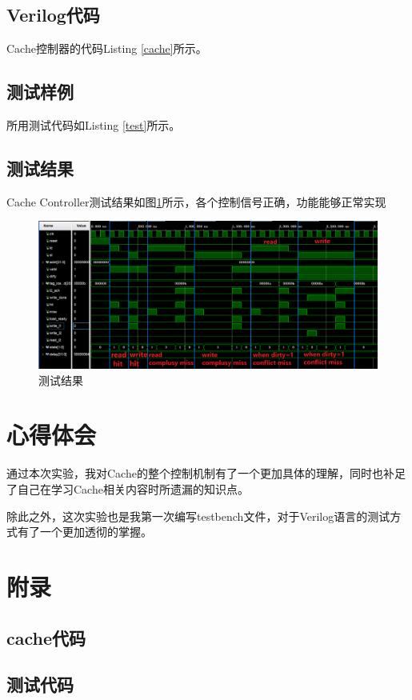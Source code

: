 \documentclass{../source/zjureport}
\begin{document}
        \subsection{Verilog代码}
            Cache控制器的代码Listing \ref{cache}所示。
            
        \subsection{测试样例}
            所用测试代码如Listing \ref{test}所示。
            
        \subsection{测试结果}
            Cache Controller测试结果如图\ref{结果}所示，各个控制信号正确，功能能够正常实现
            \begin{figure}[H]
                \centering
                \includegraphics[width = \textwidth]{figure/测试.png}
                \caption{测试结果}
                \label{结果}
            \end{figure}
    \section{心得体会}
        通过本次实验，我对Cache的整个控制机制有了一个更加具体的理解，同时也补足了自己在学习Cache相关内容时所遗漏的知识点。

        除此之外，这次实验也是我第一次编写testbench文件，对于Verilog语言的测试方式有了一个更加透彻的掌握。

    \section{附录}
        \subsection{cache代码}
        
        \subsection{测试代码}
        
\end{document}
